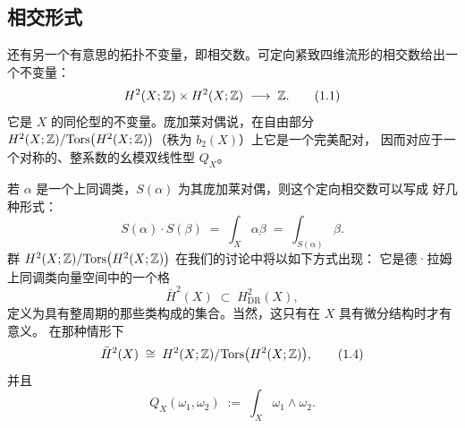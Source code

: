 
\subsection{相交形式}

还有另一个有意思的拓扑不变量，即相交数。可定向紧致四维流形的相交数给出一个不变量：
\begin{equation}
  H^{2}(X;\mathbb{Z})\times H^{2}(X;\mathbb{Z})\;\longrightarrow\;\mathbb{Z} .
  \tag{1.1}
\end{equation}
它是 $X$ 的同伦型的不变量。庞加莱对偶说，在自由部分
$H^{2}(X;\mathbb{Z})/\mathrm{Tors}\big(H^{2}(X;\mathbb{Z})\big)$（秩为 $b_{2}(X)$）上它是一个完美配对，
因而对应于一个对称的、整系数的幺模双线性型 $Q_{X}$。

若 $\alpha$ 是一个上同调类，$S(\alpha)$ 为其庞加莱对偶，则这个定向相交数可以写成
好几种形式：
\begin{equation}
  S(\alpha)\cdot S(\beta)
  \;=\;\int_{X}\alpha\beta
  \;=\;\int_{S(\alpha)}\beta .
  \tag{1.2}
\end{equation}
群 $H^{2}(X;\mathbb{Z})/\mathrm{Tors}\big(H^{2}(X;\mathbb{Z})\big)$ 在我们的讨论中将以如下方式出现：
它是德·拉姆上同调类向量空间中的一个格
\begin{equation}
  \bar{H}^{2}(X)\;\subset\;H^{2}_{\mathrm{DR}}(X),
  \tag{1.3}
\end{equation}
定义为具有整周期的那些类构成的集合。当然，这只有在 $X$ 具有微分结构时才有意义。
在那种情形下
\begin{equation}
  \bar{H}^{2}(X)\;\cong\;H^{2}(X;\mathbb{Z})/\mathrm{Tors}\big(H^{2}(X;\mathbb{Z})\big),
  \tag{1.4}
\end{equation}
并且
\begin{equation}
  Q_{X}(\omega_{1},\omega_{2})\;:=\;\int_{X}\omega_{1}\wedge\omega_{2}.
  \tag{1.5}
\end{equation}


